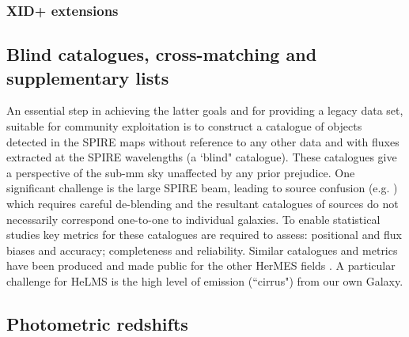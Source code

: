 \documentclass[usenatbib]{mnras}
\begin{document}
\subsubsection{XID+ extensions}


\subsection[Blind catalogues, cross-matching and supplementary lists\\{\color{red}Some of this should go into the strategy as it is not implemented in DR1, but this is where to discuss the blind SPIRE catalogues that Steven has produced, plus spec-z catalogues, radio catalogues?}]{Blind catalogues, cross-matching and supplementary lists}

An essential step in achieving the latter goals and for providing a legacy data
set, suitable for community exploitation is to construct a catalogue of objects
detected in the SPIRE maps without reference to any other data and with fluxes
extracted at the SPIRE wavelengths (a `blind" catalogue).  These catalogues give
a perspective of the sub-mm sky unaffected by any prior prejudice. One
significant challenge is the large SPIRE beam, leading to source confusion (e.g.
\citealt{Nguyen:2010lr}) which requires careful de-blending and the resultant
catalogues of sources do not necessarily correspond one-to-one to individual
galaxies.   To enable statistical studies key metrics for these catalogues are
required to assess: positional and flux biases and accuracy; completeness and
reliability.   Similar catalogues and metrics have been produced and made public
for the other HerMES fields \citep{Smith:2012lr,Wang:2013lr}. A particular
challenge for HeLMS is the high level of emission (``cirrus") from our own
Galaxy.

\subsection[Photometric redshifts\\{color{red} A summary of Ken's paper(s) and any details of exactly what is done for DR1 that is not included in those.}]{Photometric redshifts}
\end{document}
